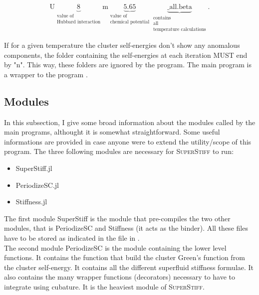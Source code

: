 \documentclass{article}
\begin{document}
\begin{equation}
\label{name_folder_inside_tp}
\text{U}\underbrace{8}_{\substack{\text{value of}\\ \text{Hubbard interaction}}}\text{m}\underbrace{5.65}_{\substack{\text{value of}\\ \text{chemical potential}}}\underbrace{\text{\_all.beta}}_{\substack{\text{contains}\\ \text{all}\\ \text{temperature calculations}}}.
\end{equation}

If for a given temperature the cluster self-energies don't show any anomalous components, the folder containing the self-energies at each iteration MUST end by "n". This way, these folders are ignored by the program. The main program  is a wrapper to the program .

\subsection{Modules}
\label{sec:modules}

In this subsection, I give some broad information about the modules called by the main programs, althought it is somewhat straightforward. Some useful informations are provided in case anyone were to extend the utility/scope of this program. The three following modules are necessary for \textsc{SuperStiff} to run:

\begin{itemize}
\item SuperStiff.jl
\item PeriodizeSC.jl
\item Stiffness.jl
\end{itemize}

The first module SuperStiff is the module that pre-compiles the two other modules, that is PeriodizeSC and Stiffness (it acts as the binder). All these files have to be stored as indicated in the  file in .\\

The second module PeriodizeSC is the module containing the lower level functions. It contains the function that build the cluster Green's function from the cluster self-energy. It contains all the different superfluid stiffness formulae. It also contains the many wrapper functions (decorators) necessary to have to integrate using cubature. It is the heaviest module of \textsc{SuperStiff}.\\
\end{document}
